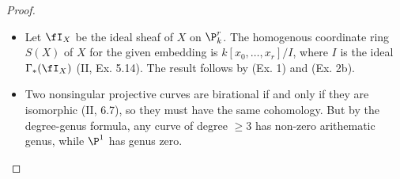 \documentclass[a4paper]{article}
\begin{document}
\begin{enumerate} [label=\textbf{\arabic*.}, leftmargin=0em]
\begin{proof}
\begin{itemize} [leftmargin=0cm]
            \item[(b)] Let $\fI_X$ be the ideal sheaf of $X$ on $\P_k^r$.
                  The homogenous coordinate ring $S(X)$ of $X$ for the given embedding is $k[x_0, \dots, x_r] / I$, where $I$ is the ideal $\Gamma_*(\fI_X)$ (II, Ex. 5.14).
                  The result follows by (Ex. 1) and (Ex. 2b).

            \item[(c)] Two nonsingular projective curves are birational if and only if they are isomorphic (II, 6.7), so they must have the same cohomology.
                  But by the degree-genus formula, any curve of degree $\geq 3$ has non-zero arithematic genus, while $\P^1$ has genus zero.
          \end{itemize}
        \end{proof}


\end{enumerate}
\end{document}
